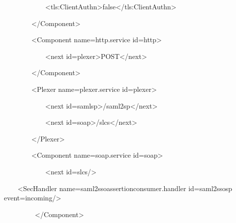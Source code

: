 \documentclass{article}
\begin{document}
{\ttfamily\color{black}
\ \ \ \ \ \ \ \ \ \ \ \ {\textless}tls:ClientAuthn{\textgreater}false{\textless}/tls:ClientAuthn{\textgreater}
}

{\ttfamily\color{black}
\ \ \ \ \ \ \ \ {\textless}/Component{\textgreater} }

{\ttfamily\color{black}
\ \ \ \ \ \ \ \ {\textless}Component
name={\textquotedbl}http.service{\textquotedbl}
id={\textquotedbl}http{\textquotedbl}{\textgreater} }

{\ttfamily\color{black}
\ \ \ \ \ \ \ \ \ \ \ \ {\textless}next
id={\textquotedbl}plexer{\textquotedbl}{\textgreater}POST{\textless}/next{\textgreater}
}

{\ttfamily\color{black}
\ \ \ \ \ \ \ \ {\textless}/Component{\textgreater} }

{\ttfamily\color{black}
\ \ \ \ \ \ \ \ {\textless}Plexer
name={\textquotedbl}plexer.service{\textquotedbl}
id={\textquotedbl}plexer{\textquotedbl}{\textgreater} }

{\ttfamily\color{black}
\ \ \ \ \ \ \ \ \ \ \ \ {\textless}next
id={\textquotedbl}samlsp{\textquotedbl}{\textgreater}/saml2sp{\textless}/next{\textgreater}
}

{\ttfamily\color{black}
\ \ \ \ \ \ \ \ \ \ \ \ {\textless}next
id={\textquotedbl}soap{\textquotedbl}{\textgreater}/slcs{\textless}/next{\textgreater}
}

{\ttfamily\color{black}
\ \ \ \ \ \ \ \ {\textless}/Plexer{\textgreater} }

{\ttfamily\color{black}
\ \ \ \ \ \ \ \ {\textless}Component
name={\textquotedbl}soap.service{\textquotedbl}
id={\textquotedbl}soap{\textquotedbl}{\textgreater} }

{\ttfamily\color{black}
\ \ \ \ \ \ \ \ \ \ \ \ {\textless}next
id={\textquotedbl}slcs{\textquotedbl}/{\textgreater} }

{\ttfamily\color{black}
\ \ \ \ {\textless}SecHandler
name={\textquotedbl}\textcolor[rgb]{0.8627451,0.13725491,0.0}{saml2ssoassertionconsumer.handler}{\textquotedbl}
id={\textquotedbl}saml2ssosp{\textquotedbl}
event={\textquotedbl}incoming{\textquotedbl}/{\textgreater}}

{\ttfamily\color{black}
\ \ \ \ \ \ \ \ \ {\textless}/Component{\textgreater} }
\end{document}
